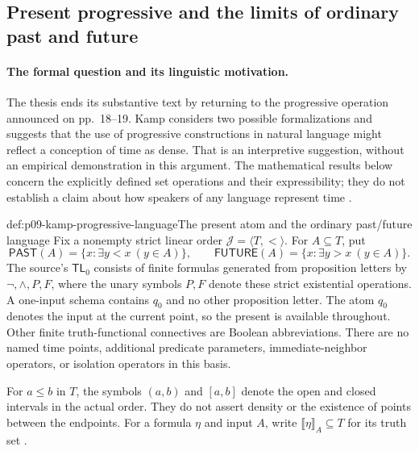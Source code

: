 
\subsection{Present progressive and the limits of ordinary past and future}
\label{sec:p09-kamp-present-progressive}

\paragraph{The formal question and its linguistic motivation.}
The thesis ends its substantive text by returning to the progressive
operation announced on pp.~18--19. Kamp considers two possible
formalizations and suggests that the use of progressive constructions in
natural language might reflect a conception of time as dense. That is
an interpretive suggestion, without an empirical demonstration in this
argument. The mathematical results below concern the explicitly defined
set operations and their expressibility; they do not establish a claim
about how speakers of any language represent time
\cite[pp.~18--19, 112--113]{Kamp1968}.

\begin{hbdefinition}{def:p09-kamp-progressive-language}{The present atom and the ordinary past/future language}
Fix a nonempty strict linear order \(\mathcal J=\langle T,<\rangle\).
For \(A\subseteq T\), put
\[
 \mathsf{PAST}(A)=\{x:\exists y<x\ (y\in A)\},\qquad
 \mathsf{FUTURE}(A)=\{x:\exists y>x\ (y\in A)\}.
\]
The source's \(\mathsf{TL}_0\) consists of finite formulas
generated from proposition letters by \(\neg,\land,P,F\),
where the unary symbols \(P,F\) denote these strict existential
operations. A one-input schema contains \(q_0\) and no other
proposition letter. The atom \(q_0\) denotes the input at the
current point, so the present is available throughout. Other finite
truth-functional connectives are Boolean abbreviations. There are
no named time points, additional predicate parameters, immediate-neighbor
operators, or isolation operators in this basis.

For \(a\leq b\) in \(T\), the symbols \((a,b)\) and
\([a,b]\) denote the open and closed intervals in the actual
order. They do not assert density or the existence of points between
the endpoints. For a formula \(\eta\) and input \(A\), write
\(\llbracket\eta\rrbracket_A\subseteq T\) for its truth set
\cite[pp.~18--19, 114]{Kamp1968}.
\end{hbdefinition}

